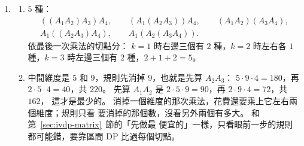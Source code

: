 \begin{enumerate}
\item
\begin{enumerate}
\item $5$ 種：
\begin{gather*}
((A_1 A_2) A_3) A_4,\qquad (A_1 (A_2 A_3)) A_4,\qquad (A_1 A_2)(A_3 A_4),\\
A_1 ((A_2 A_3) A_4),\qquad A_1 (A_2 (A_3 A_4)).
\end{gather*}
依最後一次乘法的切點分：
$k = 1$ 時右邊三個有 $2$ 種，$k = 2$ 時左右各 $1$ 種，$k = 3$ 時左邊三個有
$2$ 種，$2 + 1 + 2 = 5$。
\item 中間維度是 $5$ 和 $9$，規則先消掉 $9$，也就是先算 $A_2 A_3$：
$5 \cdot 9 \cdot 4 = 180$，再 $2 \cdot 5 \cdot 4 = 40$，共 $220$。 先算
$A_1 A_2$ 是 $2 \cdot 5 \cdot 9 = 90$，再 $2 \cdot 9 \cdot 4 = 72$，共 $162$，
這才是最少的。 消掉一個維度的那次乘法，花費還要乘上它左右兩個維度；規則只看
要消掉的那個數，沒看另外兩個有多大。 和第~\ref{sec:ivdp-matrix}~節的「先做最
便宜的」一樣，只看眼前一步的規則都可能錯，要靠區間 DP 比過每個切點。
\end{enumerate}
\end{enumerate}
